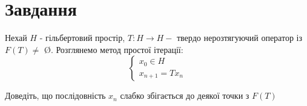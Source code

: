 
\chapter{Завдання \theHchapter}

\begin{tcolorbox}[title=Завдання]
    Нехай $H$ - гільбертовий простір, $T: H \rightarrow H-$ твердо нерозтягуючий
    оператор із $F(T) \neq$ Ø. Розглянемо метод простої ітерації:
    $$
    \left\{\begin{array}{l}
    x_{0} \in H \\
    x_{n+1}=T x_{n}
    \end{array}\right.
    $$

    Доведіть, що послідовність $x_{n}$ слабко збігається 
    до деякої точки з $F(T)$
\end{tcolorbox}



